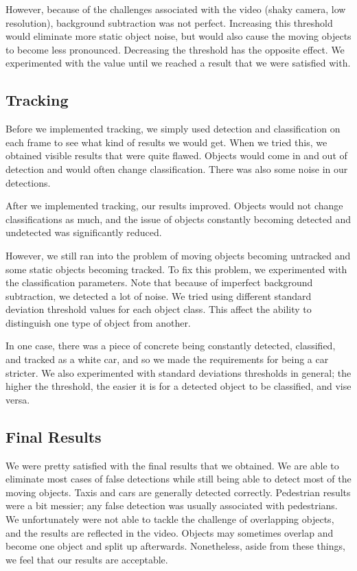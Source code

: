 \documentclass[a4paper, 10pt, conference]{ieeeconf}      %
\begin{document}
However, because of the challenges associated with the video (shaky camera, low resolution), background subtraction was not perfect. Increasing this threshold would eliminate more static object noise, but would also cause the moving objects to become less pronounced. Decreasing the threshold has the opposite effect. We experimented with the value until we reached a result that we were satisfied with. \newline

\subsection{Tracking}
Before we implemented tracking, we simply used detection and classification on each frame to see what kind of results we would get. When we tried this, we obtained visible results that were quite flawed. Objects would come in and out of detection and would often change classification. There was also some noise in our detections. \newline

After we implemented tracking, our results improved. Objects would not change classifications as much, and the issue of objects constantly becoming detected and undetected was significantly reduced. \newline

However, we still ran into the problem of moving objects becoming untracked and some static objects becoming tracked. To fix this problem, we experimented with the classification parameters. Note that because of imperfect background subtraction, we detected a lot of noise. We tried using different standard deviation threshold values for each object class. This affect the ability to distinguish one type of object from another. \newline

In one case, there was a piece of concrete being constantly detected, classified, and tracked as a white car, and so we made the requirements for being a car stricter. We also experimented with standard deviations thresholds in general; the higher the threshold, the easier it is for a detected object to be classified, and vise versa. \newline

\subsection{Final Results}
We were pretty satisfied with the final results that we obtained. We are able to eliminate most cases of false detections while still being able to detect most of the moving objects. Taxis and cars are generally detected correctly. Pedestrian results were a bit messier; any false detection was usually associated with pedestrians. We unfortunately were not able to tackle the challenge of overlapping objects, and the results are reflected in the video. Objects may sometimes overlap and become one object and split up afterwards. Nonetheless, aside from these things, we feel that our results are acceptable. \newline
\end{document}
